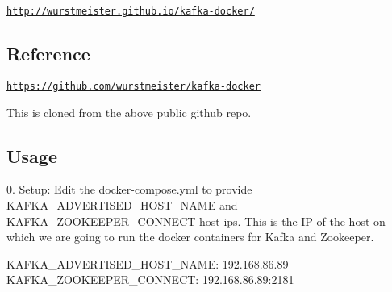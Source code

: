 \href{http://wurstmeister.github.io/kafka-docker/}{\tt http\+://wurstmeister.\+github.\+io/kafka-\/docker/}

\subsection*{Reference}

\href{https://github.com/wurstmeister/kafka-docker}{\tt https\+://github.\+com/wurstmeister/kafka-\/docker}

This is cloned from the above public github repo.

\subsection*{Usage}

0. Setup\+: Edit the docker-\/compose.\+yml to provide K\+A\+F\+K\+A\+\_\+\+A\+D\+V\+E\+R\+T\+I\+S\+E\+D\+\_\+\+H\+O\+S\+T\+\_\+\+N\+A\+ME and K\+A\+F\+K\+A\+\_\+\+Z\+O\+O\+K\+E\+E\+P\+E\+R\+\_\+\+C\+O\+N\+N\+E\+CT host ips. This is the IP of the host on which we are going to run the docker containers for Kafka and Zookeeper.


\begin{DoxyCode}
KAFKA\_ADVERTISED\_HOST\_NAME: 192.168.86.89
KAFKA\_ZOOKEEPER\_CONNECT: 192.168.86.89:2181
\end{DoxyCode}

